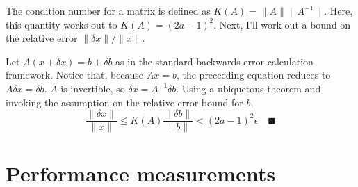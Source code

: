 \documentclass[12pt,fleqn,leqno,letterpaper]{article}
\begin{document}
The condition number for a matrix is defined as $K(A) = \|A\| \|A^{-1}\|$. Here,
this quantity works out to $K(A)=(2a-1)^2$. Next, I'll work out a bound on the
relative error $\|\delta x\|/\|x\|$.

Let $A(x + \delta x) = b + \delta b$ as in the standard backwards error
calculation framework. Notice that, because $Ax=b$, the preceeding equation
reduces to $A\delta x = \delta b$. $A$ is invertible, so
$\delta x = A^{-1}\delta b$. Using a ubiquetous theorem and invoking the
assumption on the relative error bound for $b$,
$$
\frac{\|\delta x\|}{\|x\|} \le K(A) \frac{\|\delta b\|}{\|b\|} <
(2a-1)^2\epsilon
\quad\blacksquare
$$

\section{Performance measurements}
\end{document}
